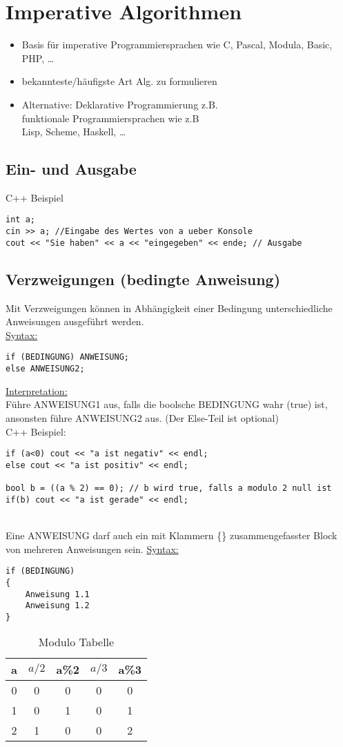 \section{Imperative Algorithmen}
\begin{itemize}
 \item Basis für imperative Programmiersprachen wie C, Pascal, Modula, Basic, PHP, \dots
 \item bekannteste/häufigste Art Alg. zu formulieren
 \item Alternative: Deklarative Programmierung z.B. \\
 funktionale Programmiersprachen wie z.B \\
 Lisp, Scheme, Haskell, \dots
\end{itemize}

\subsection{Ein- und Ausgabe}
 C++ Beispiel
 \begin{lstlisting}
int a;
cin >> a; //Eingabe des Wertes von a ueber Konsole
cout << "Sie haben" << a << "eingegeben" << ende; // Ausgabe
 \end{lstlisting}

\subsection{Verzweigungen (bedingte Anweisung)}
Mit Verzweigungen können in Abhängigkeit einer Bedingung unterschiedliche Anweisungen ausgeführt werden. \\
\underline{Syntax:} \\
\begin{lstlisting}
if (BEDINGUNG) ANWEISUNG;
else ANWEISUNG2;
\end{lstlisting}
\underline{Interpretation:} \\
Führe ANWEISUNG1 aus, falls die boolsche BEDINGUNG wahr (true) ist, ansonsten führe ANWEISUNG2 aus. (Der Else-Teil ist optional) \\
C++ Beispiel:
\begin{lstlisting}
if (a<0) cout << "a ist negativ" << endl;
else cout << "a ist positiv" << endl;

bool b = ((a % 2) == 0); // b wird true, falls a modulo 2 null ist
if(b) cout << "a ist gerade" << endl;
\end{lstlisting}

~\\
Eine ANWEISUNG darf auch ein mit Klammern \{\} zusammengefasster Block von mehreren Anweisungen sein.
\newpage
\underline{Syntax:} \\
\begin{lstlisting}
if (BEDINGUNG)
{
	Anweisung 1.1
	Anweisung 1.2
}
\end{lstlisting}

\begin{table}[h]
	\caption[ModuloTabelle]{Modulo Tabelle}
	\begin{center}
	\begin{tabular}{c|c|c|c|c}
		a & $a/2$ & a\%2 & $a/3$ & a\%3 \\
		\hline
		0 & 0 & 0 & 0 & 0\\
		1 & 0 & 1 & 0 & 1 \\
		2 & 1 & 0 & 0 & 2 \\
	\end{tabular}
	\end{center}
\end{table}
